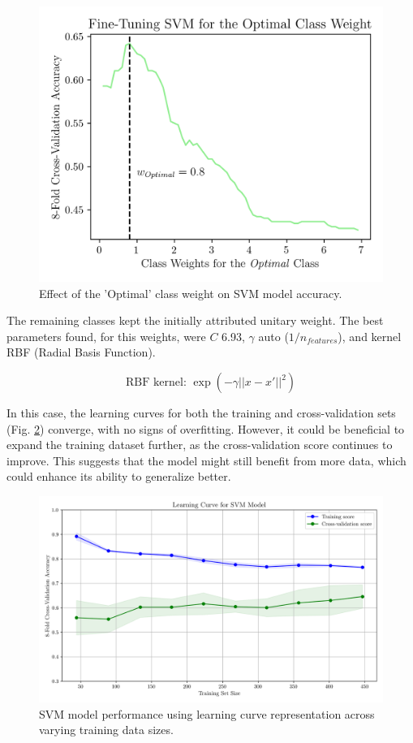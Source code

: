 \documentclass[conference]{IEEEtran}
\begin{document}
\begin{figure}[H]
    \centering
    \includegraphics[width=1\linewidth]{assets/SVM_OptimalWeight.png}
    \caption{Effect of the 'Optimal' class weight on SVM model accuracy.}
    \label{svm_weight}
\end{figure} %

The remaining classes kept the initially attributed unitary weight. The best parameters found, for this weights, were $C$ 6.93, $\gamma$ auto ($1/n_{features}$), and kernel RBF (Radial Basis Function).

$$\text{RBF kernel: } \exp(-\gamma ||x - x'||^2)$$ %

In this case, the learning curves  for both the training and cross-validation sets (Fig. \ref{svm_learningcurve}) converge, with no signs of overfitting. However, it could be beneficial to expand the training dataset further, as the cross-validation score continues to improve. This suggests that the model might still benefit from more data, which could enhance its ability to generalize better.

\begin{figure}[H]
    \centering
    \includegraphics[width=1\linewidth]{assets/SVM_LearningCurve.png}
    \caption{SVM model performance using learning curve representation across varying training data sizes.}
    \label{svm_learningcurve}
\end{figure} %
\end{document}
